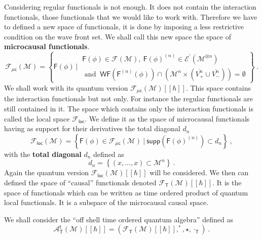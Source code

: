 \documentclass[12pt]{book}
\newcommand{\supp}{\mathsf{supp}}
\newcommand{\WF}{\mathsf{WF}}
\newcommand{\Acal}{\mathcal{A}}
\newcommand{\Ecal}{\mathcal{E}}
\newcommand{\Fcal}{\mathcal{F}}
\newcommand{\Mcal}{\mathcal{M}}
\newcommand{\Fsf}{\mathsf{F}}
\newcommand{\Tsf}{\mathsf{T}}
\newcommand{\csf}{\mathsf{c}}
\newcommand{\tsf}{\mathsf{t}}
\theoremstyle{break}
\begin{document}
Considering regular functionals is not enough. It does not contain the interaction functionals, those functionals that we would like to work with. Therefore we have to defined a new space of functionals, it is done by imposing a less restrictive condition on the wave front set. We shall call this new space the space of \textbf{microcausal functionals}.
%
\begin{equation*}
\Fcal_{\mu\csf}(\Mcal) = \left\{ 
\Fsf(\phi) \ \bigg| \ 
\begin{array}{l}
\Fsf(\phi) \in \Fcal(\Mcal), \ \Fsf(\phi)^{(n)} \in \Ecal^\prime(\Mcal^{\otimes n}) \\
\mbox{ and } \ \WF(\Fsf^{(n)}(\phi)) \cap \left( \Mcal^n \times ( \overline{V^{n}_{+}} \cup \overline{V^{n}_{-}} ) \right)  = \emptyset 
\end{array}
\right\} \ .
\end{equation*}
%
We shall work with its quantum version $\Fcal_{\mu\csf}(\Mcal)[[\hbar]]$. This space contains the interaction functionals but not only. For instance the regular functionals are still contained in it. The space which contains only the interaction functionals is called the local space $\mathcal{F}_\mathsf{loc}$. We define it as the space of microcausal functionals having as support for their derivatives the total diagonal $d_n$
%
\begin{equation*}
\Fcal_{\mathsf{loc}}(\Mcal) = \left\{ \Fsf(\phi) \in \Fcal_{\mu\csf}(\Mcal) \ \bigg| \ \supp\left(\Fsf(\phi)^{(n)}\right) \subset d_n \right\} \ ,
\end{equation*}
%
with the \textbf{total diagonal} $d_n$ defined as
%
\begin{equation}
d_n = \left\{ (x,\dots,x) \subset \Mcal^n \right\} \ .
\label{eq:total_diag}
\end{equation}
%
Again the quantum version $\Fcal_{\mathsf{loc}}(\Mcal)[[\hbar]]$ will be considered. We then can defined the space of ``causal'' functionals denoted $\Fcal_\Tsf(\Mcal)[[\hbar]]$. It is the space of functionals which can be written as time ordered product of quantum local functionals. It is a subspace of the microcausal causal space.




We shall consider the ``off shell time ordered quantum algebra'' defined as
%
\begin{equation*}
\Acal_\Tsf^\tsf(\Mcal)[[\hbar]] = \left( \Fcal_\Tsf(\Mcal)[[\hbar]] , ^\ast , \star , \cdot_\Tsf \right) \ . 
\end{equation*}
\end{document}
